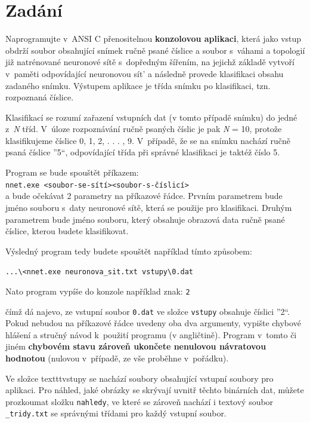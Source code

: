 \documentclass[12pt, a4paper, titlepage]{report}
\begin{document}
\chapter{Zadání}
\par\noindent
Naprogramujte v~ANSI C přenositelnou \textbf{konzolovou aplikaci}, která jako vstup obdrží soubor obsahující snímek ručně psané číslice a soubor s~váhami a topologií již natrénované neuronové sítě s~dopředným šířením, na jejichž základě vytvoří v~paměti odpovídající neuronovou sít’ a následně provede klasifikaci obsahu zadaného snímku. Výstupem aplikace je třída snímku po klasifikaci, tzn. rozpoznaná číslice.
\par
Klasifikací se rozumí zařazení vstupních dat (v tomto případě snímku) do jedné z~\textit{N} tříd. V~úloze rozpoznávání ručně psaných číslic je pak \textit{N} = 10, protože klasifikujeme číslice 0, 1, 2, . . . , 9. V~případě, že se na snímku nachází ručně psaná číslice ”5“, odpovídající třída při správné klasifikaci je taktéž číslo 5.\\
\par\noindent
Program se bude spouštět příkazem:\\ \texttt{nnet.exe \textless soubor-se-sítí\textgreater \textless soubor-s-číslicí\textgreater}\\ a bude očekávat 2 parametry na příkazové řádce. Prvním parametrem bude jméno souboru s~daty neuronové sítě, která se použije pro klasifikaci. Druhým parametrem bude jméno souboru, který obsahuje obrazová data ručně psané číslice, kterou budete klasifikovat.\\
\par\noindent
Výsledný program tedy budete spouštět například tímto způsobem:
\par\noindent
\texttt{...\textbackslash\textless nnet.exe neuronova\_sit.txt vstupy\textbackslash0.dat}\\
\par\noindent
Nato program vypíše do konzole například znak: \texttt{2}
\par\noindent
čímž dá najevo, ze vstupní soubor \texttt{0.dat} ve složce \texttt{vstupy} obsahuje číslici ”2“.
\newpage\noindent
Pokud nebudou na příkazové řádce uvedeny oba dva argumenty, vypište chybové hlášení a stručný návod k~použití programu (v angličtině). Program v~tomto či jiném \textbf{chybovém stavu zároveň ukončete nenulovou návratovou hodnotou} (nulovou v~případě, ze vše proběhne v~pořádku).
\par
Ve složce texttt{vstupy} se nachází soubory obsahující vstupní soubory pro aplikaci. Pro náhled, jaké obrázky se skrývají uvnitř těchto binárních dat, můžete prozkoumat složku \texttt{nahledy}, ve které se zároveň nachází i textový soubor \texttt{\_tridy.txt} se správnými třídami pro každý vstupní soubor.\\
\end{document}
